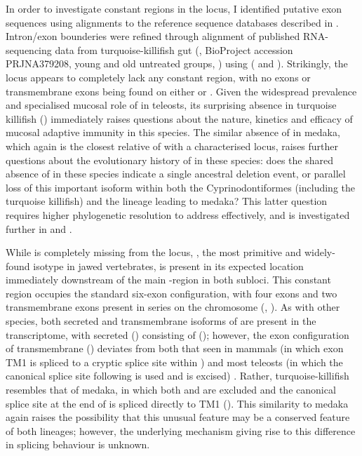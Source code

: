 In order to investigate constant regions in the \nfu \igh{} locus, I identified putative exon sequences using  alignments to the reference sequence databases described in . Intron/exon bounderies were refined through alignment of published RNA-sequencing data from turquoise-killifish gut (\parencite{smith2017microbiota}, BioProject accession PRJNA379208, young and old untreated groups, ) using  ( and ). Strikingly, the \nfu \igh{} locus appears to completely lack any  constant region, with no \cz{} exons or  transmembrane exons being found on either  or . Given the widespread prevalence and specialised mucosal role of  in teleosts, its surprising absence in turquoise killifish () immediately raises questions about the nature, kinetics and efficacy of mucosal adaptive immunity in this species. The similar absence of  in medaka, which again is the closest relative of \Nfu with a characterised locus, raises further questions about the evolutionary history of  in these species: does the shared absence of  in these species indicate a single ancestral deletion event, or parallel loss of this important isoform within both the Cyprinodontiformes (including the turquoise killifish) and the lineage leading to medaka? This latter question requires higher phylogenetic resolution to address effectively, and is investigated further in  and .
	
	While  is completely missing from the \Nfu \igh{} locus, , the most primitive and widely-found isotype in jawed vertebrates, is present in its expected location immediately downstream of the main \jh-region in both subloci. This constant region occupies the standard six-exon configuration, with four \cm{} exons and two transmembrane exons present in series on the chromosome (, ). As with other species, both secreted and transmembrane isoforms of  are present in the transcriptome, with secreted  () consisting of  (); however, the exon configuration of transmembrane  () deviates from both that seen in mammals (in which exon TM1 is spliced to a cryptic splice site within ) and most teleosts (in which the canonical splice site following  is used and  is excised) \parencite{fillatreau2013astonishing}. Rather, turquoise-killifish  resembles that of medaka, in which both  and  are excluded and the canonical splice site at the end of  is spliced directly to TM1 (). This similarity to medaka again raises the possibility that this unusual feature may be a conserved feature of both lineages; however, the underlying mechanism giving rise to this difference in splicing behaviour is unknown.
	
